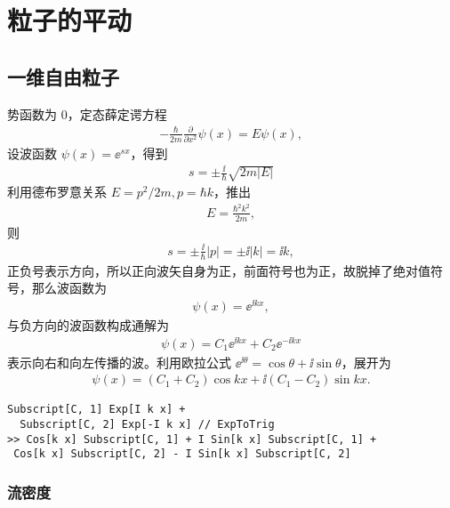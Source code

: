 \chapter{粒子的平动}

\section{一维自由粒子}

势函数为 0，定态薛定谔方程
\begin{eqnarray}
    -\frac{\hbar}{2m} \frac{\partial}{\partial x^2}\psi(x) = E \psi(x),
\end{eqnarray}
设波函数 $\psi(x) = \ee^{s x}$，得到
\begin{eqnarray}
    s = \pm \frac{\ii}{\hbar} \sqrt{2m |E|}
\end{eqnarray}
利用德布罗意关系 $E = p^2 / 2m, p = \hbar k$，推出
\begin{eqnarray}
    E = \frac{\hbar^2k^2}{2m},
\end{eqnarray}
则
\begin{eqnarray}
    s = \pm \frac{\ii}{\hbar}|p| = \pm \ii |k| = \ii k,
\end{eqnarray}
正负号表示方向，所以正向波矢自身为正，前面符号也为正，故脱掉了绝对值符号，那么波函数为
\begin{eqnarray}
    \psi(x) = \ee^{\ii kx},
\end{eqnarray}
与负方向的波函数构成通解为
\begin{eqnarray}
    \psi(x) = C_1 \ee^{\ii kx} + C_2 \ee^{-\ii kx}
\end{eqnarray}
表示向右和向左传播的波。利用欧拉公式 $\ee^{\ii\theta} = \cos\theta + \ii\sin\theta$，展开为
\begin{eqnarray}
    \psi(x) = (C_1 + C_2) \cos kx + \ii (C_1 - C_2) \sin kx.  
\end{eqnarray}
\begin{lstlisting}
Subscript[C, 1] Exp[I k x] + 
  Subscript[C, 2] Exp[-I k x] // ExpToTrig
>> Cos[k x] Subscript[C, 1] + I Sin[k x] Subscript[C, 1] + 
 Cos[k x] Subscript[C, 2] - I Sin[k x] Subscript[C, 2]
\end{lstlisting}

\subsection{流密度}

